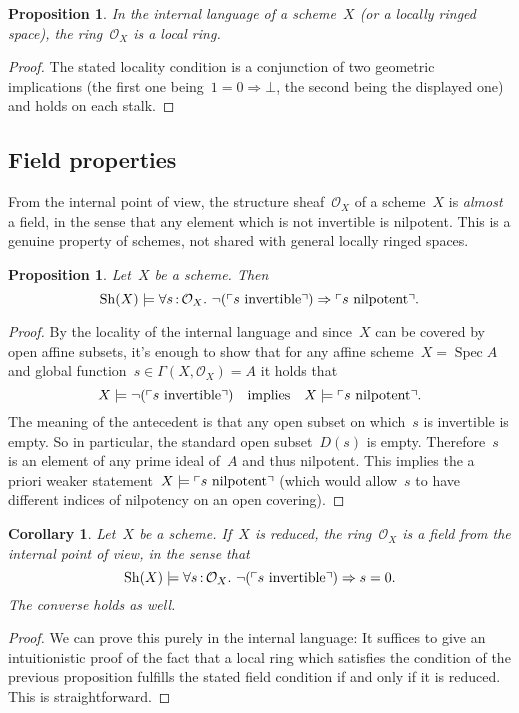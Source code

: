 \documentclass[10pt]{amsart}
\theoremstyle{definition}
\theoremstyle{plain}
\newtheorem{prop}[defn]{Proposition}
\newtheorem{cor}[defn]{Corollary}
\theoremstyle{remark}
\renewcommand{\O}{\mathcal{O}}
\newcommand{\Sh}{\mathrm{Sh}}
\DeclareMathOperator{\Spec}{Spec}
\newcommand{\?}{\,{:}\,}
\renewcommand{\_}{\mathpunct{.}\,}
\newcommand{\speak}[1]{\ulcorner\text{\textnormal{#1}}\urcorner}
\begin{document}
\begin{prop}In the internal language of a scheme~$X$ (or a locally ringed
space), the ring~$\O_X$ is a local ring.\end{prop}
\begin{proof}The stated locality condition is a conjunction of two geometric
implications (the first one being~$1 = 0 \Rightarrow \bot$, the second being
the displayed one) and holds on each stalk.\end{proof}


\subsection{Field properties} From the internal point of view, the structure
sheaf~$\O_X$ of a scheme~$X$ is \emph{almost} a field, in the sense that any
element which is not invertible is nilpotent. This is a genuine property of
schemes, not shared with general locally ringed spaces.

\begin{prop}Let~$X$ be a scheme. Then
\[ \Sh(X) \models \forall s\?\O_X\_ \neg(\speak{$s$ invertible}) \Rightarrow
\speak{$s$ nilpotent}. \]
\end{prop}
\begin{proof}By the locality of the internal language and since~$X$ can be
covered by open affine subsets, it's enough to show that for any affine
scheme~$X = \Spec A$ and global function~$s \in \Gamma(X,\O_X) = A$ it holds
that
\[ X \models \neg(\speak{$s$ invertible}) \quad\text{implies}\quad
  X \models \speak{$s$ nilpotent}. \]
The meaning of the antecedent is that any open subset on which~$s$ is
invertible is empty. So in particular, the standard open subset~$D(s)$ is
empty. Therefore~$s$ is an element of any prime ideal of~$A$ and thus
nilpotent. This implies the a priori weaker statement~$X \models \speak{$s$
nilpotent}$ (which would allow~$s$ to have different indices of nilpotency on
an open covering).
\end{proof}

\begin{cor}\label{cor:field-reduced}
Let~$X$ be a scheme. If~$X$ is reduced, the ring~$\O_X$ is a field
from the internal point of view, in the sense that
\[ \Sh(X) \models \forall s\?\O_X\_ \neg(\speak{$s$ invertible}) \Rightarrow
s=0. \]
The converse holds as well.\end{cor}
\begin{proof}We can prove this purely in the internal language: It suffices to
give an intuitionistic proof of the fact that a local ring which satisfies the
condition of the previous proposition fulfills the stated field condition if
and only if it is reduced. This is straightforward.
\end{proof}
\end{document}
